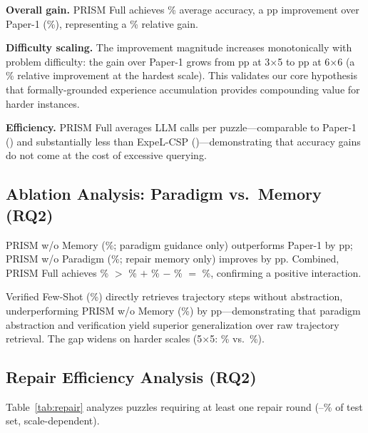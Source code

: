 \textbf{Overall gain.} PRISM Full achieves \% average accuracy, a pp improvement over Paper-1 (\%), representing a \% relative gain.

\textbf{Difficulty scaling.} The improvement magnitude increases monotonically with problem difficulty:
the gain over Paper-1 grows from pp at 3$\times$5 to pp at 6$\times$6 (a \% relative improvement at the hardest scale). This validates our core hypothesis that formally-grounded experience accumulation provides compounding value for harder instances.

\textbf{Efficiency.} PRISM Full averages  LLM calls per puzzle—comparable to Paper-1 () and substantially less than ExpeL-CSP ()—demonstrating that accuracy gains do not come at the cost of excessive querying.

\subsection{Ablation Analysis: Paradigm vs.\ Memory (RQ2)}

PRISM w/o Memory (\%; paradigm guidance only) outperforms Paper-1 by pp; PRISM w/o Paradigm (\%; repair memory only) improves by pp. Combined, PRISM Full achieves \% $>$ \% $+$ \% $-$ \% $=$ \%, confirming a positive interaction.

Verified Few-Shot (\%) directly retrieves trajectory steps without abstraction, underperforming PRISM w/o Memory (\%) by pp—demonstrating that paradigm abstraction and verification yield superior generalization over raw trajectory retrieval. The gap widens on harder scales (5$\times$5: \% vs.\ \%).

\subsection{Repair Efficiency Analysis (RQ2)}
\label{ssec:repair-analysis}

Table~\ref{tab:repair} analyzes puzzles requiring at least one repair round (--\% of test set, scale-dependent).

